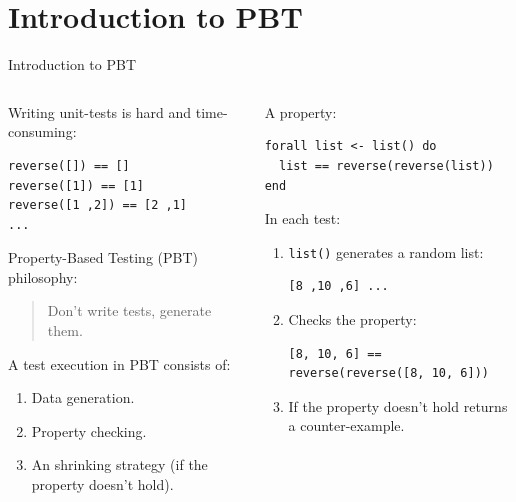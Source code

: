 \documentclass[aspectratio=169, 10pt]{beamer}
\begin{document}
\section{Introduction to PBT}
\label{sec:org41628fa}
\begin{frame}[label={sec:org422a3de},fragile]{Introduction to PBT}
 \begin{columns}
\begin{column}{0.48\columnwidth}
Writing unit-tests is hard and time-consuming:

\lstset{language=elixir,label= ,caption= ,captionpos=b,numbers=none,style=display}
\begin{lstlisting}
reverse([]) == []
reverse([1]) == [1]
reverse([1 ,2]) == [2 ,1]
...
\end{lstlisting}

Property-Based Testing (PBT) philosophy:

\begin{quote}
Don't write tests, generate them.
\end{quote}

A test execution in PBT consists of:
\begin{enumerate}
\item Data generation.
\item Property checking.
\item An shrinking strategy (if the property doesn't hold).
\end{enumerate}
\end{column}

\begin{column}{0.48\columnwidth}
A property:

\lstset{language=elixir,label= ,caption= ,captionpos=b,numbers=none,style=display}
\begin{lstlisting}
forall list <- list() do
  list == reverse(reverse(list))
end
\end{lstlisting}

In each test:
\begin{enumerate}
\item \texttt{list()} generates a random list:
\lstset{language=elixir,label= ,caption= ,captionpos=b,numbers=none,style=display}
\begin{lstlisting}
[8 ,10 ,6] ...
\end{lstlisting}

\item Checks the property:
\lstset{language=elixir,label= ,caption= ,captionpos=b,numbers=none,style=display}
\begin{lstlisting}
[8, 10, 6] == reverse(reverse([8, 10, 6]))
\end{lstlisting}

\item If the property doesn't hold returns a counter-example.
\end{enumerate}
\end{column}
\end{columns}
\end{frame}
\end{document}
